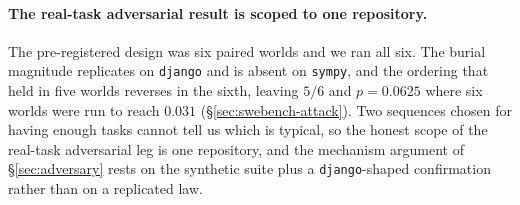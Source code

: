 \paragraph{The real-task adversarial result is scoped to one repository.}
The pre-registered design was six paired worlds and we ran all six. The
burial magnitude replicates on \texttt{django} and is absent on
\texttt{sympy}, and the ordering that held in five worlds reverses in the
sixth, leaving $5/6$ and $p = 0.0625$ where six worlds were run to reach
$0.031$ (\S\ref{sec:swebench-attack}). Two sequences chosen for having
enough tasks cannot tell us which is typical, so the honest scope of the
real-task adversarial leg is one repository, and the mechanism argument
of \S\ref{sec:adversary} rests on the synthetic suite plus a
\texttt{django}-shaped confirmation rather than on a replicated law.


